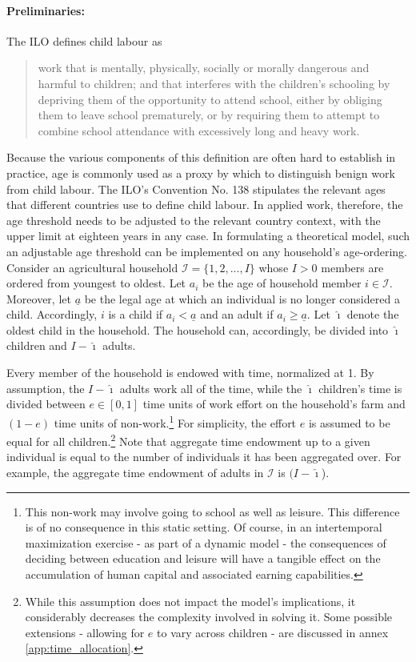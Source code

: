 \documentclass[a4paper,12pt]{article}
\theoremstyle{plain}
\theoremstyle{definition}
\theoremstyle{definition}
\theoremstyle{definition}
\theoremstyle{definition}
\begin{document}
\paragraph{Preliminaries:}
\label{sec:Preliminaries}
The ILO defines child labour as

\begin{quote}
work that is mentally, physically, socially or morally dangerous and harmful to children; and that interferes with the children’s schooling by depriving them of the opportunity to attend school, either by obliging them to leave school prematurely, or by requiring them to attempt to combine school attendance with excessively long and heavy work.
\end{quote}
Because the various components of this definition are often hard to establish in practice, age is commonly used as a proxy by which to distinguish benign work from child labour. The ILO’s Convention No. 138 stipulates the relevant ages that different countries use to define child labour. In applied work, therefore, the age threshold needs to be adjusted to the relevant country context, with the upper limit at eighteen years in any case. In formulating a theoretical model, such an adjustable age threshold can be implemented on any household's age-ordering. Consider an agricultural household $\mathcal{I}=\{1,2,...,I\}$ whose $I>0$ members are ordered from youngest to oldest. Let $a_i$ be the age of household member $i\in\mathcal{I}$. Moreover, let $\underline{a}$ be the legal age at which an individual is no longer considered a child. Accordingly, $i$ is a child if $a_i<\underline{a}$ and an adult if $a_i\geq \underline{a}$. Let $\hat{\imath}$ denote the oldest child in the household. The household can, accordingly, be divided into $\hat{\imath}$ children and $I-\hat{\imath}$ adults.

Every member of the household is endowed with time, normalized at 1. By assumption, the $I-\hat{\imath}$ adults work all of the time, while the $\hat{\imath}$ children's time is divided between $e\in[0,1]$ time units of work effort on the household's farm and $(1-e)$ time units of non-work.\footnote{This non-work may involve going to school as well as leisure. This difference is of no consequence in this static setting. Of course, in an intertemporal maximization exercise - as part of a dynamic model - the consequences of deciding between education and leisure will have a tangible effect on the accumulation of human capital and associated earning capabilities.} For simplicity, the effort $e$ is assumed to be equal for all children.\footnote{While this assumption does not impact the model's implications, it considerably decreases the complexity involved in solving it. Some possible extensions - allowing for $e$ to vary across children - are discussed in annex \ref{app:time_allocation}.} Note that aggregate time endowment up to a given individual is equal to the number of individuals it has been aggregated over. For example, the aggregate time endowment of adults in $\mathcal{I}$ is $(I-\hat{\imath}$). 
\end{document}
